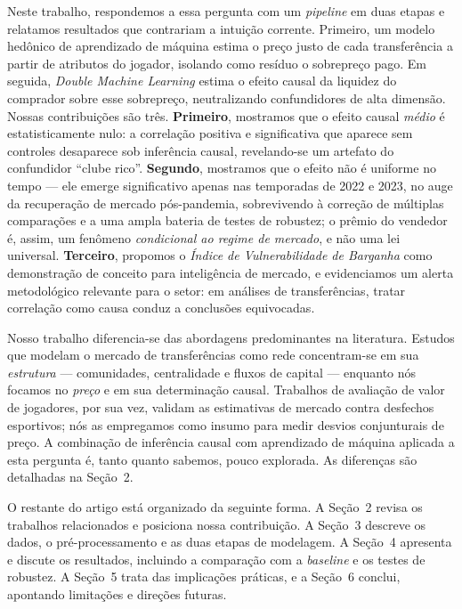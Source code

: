 \documentclass[12pt]{article}
\begin{document}
Neste trabalho, respondemos a essa pergunta com um \textit{pipeline} em duas etapas e relatamos
resultados que contrariam a intuição corrente. Primeiro, um modelo hedônico de aprendizado de máquina
estima o preço justo de cada transferência a partir de atributos do jogador, isolando como resíduo o
sobrepreço pago. Em seguida, \textit{Double Machine Learning} estima o efeito causal da liquidez do
comprador sobre esse sobrepreço, neutralizando confundidores de alta dimensão. Nossas contribuições
são três. \textbf{Primeiro}, mostramos que o efeito causal \textit{médio} é estatisticamente nulo: a
correlação positiva e significativa que aparece sem controles desaparece sob inferência causal,
revelando-se um artefato do confundidor ``clube rico''. \textbf{Segundo}, mostramos que o efeito não
é uniforme no tempo — ele emerge significativo apenas nas temporadas de 2022 e 2023, no auge da
recuperação de mercado pós-pandemia, sobrevivendo à correção de múltiplas comparações e a uma ampla
bateria de testes de robustez; o prêmio do vendedor é, assim, um fenômeno \textit{condicional ao
regime de mercado}, e não uma lei universal. \textbf{Terceiro}, propomos o \textit{Índice de
Vulnerabilidade de Barganha} como demonstração de conceito para inteligência de mercado, e
evidenciamos um alerta metodológico relevante para o setor: em análises de transferências, tratar
correlação como causa conduz a conclusões equivocadas.

Nosso trabalho diferencia-se das abordagens predominantes na literatura. Estudos que modelam o
mercado de transferências como rede concentram-se em sua \textit{estrutura} — comunidades, centralidade
e fluxos de capital — enquanto nós focamos no \textit{preço} e em sua determinação causal. Trabalhos
de avaliação de valor de jogadores, por sua vez, validam as estimativas de mercado contra desfechos
esportivos; nós as empregamos como insumo para medir desvios conjunturais de preço. A combinação de
inferência causal com aprendizado de máquina aplicada a esta pergunta é, tanto quanto sabemos, pouco
explorada. As diferenças são detalhadas na Seção~2.

O restante do artigo está organizado da seguinte forma. A Seção~2 revisa os trabalhos relacionados e
posiciona nossa contribuição. A Seção~3 descreve os dados, o pré-processamento e as duas etapas de
modelagem. A Seção~4 apresenta e discute os resultados, incluindo a comparação com a \textit{baseline}
e os testes de robustez. A Seção~5 trata das implicações práticas, e a Seção~6 conclui, apontando
limitações e direções futuras.
\end{document}
